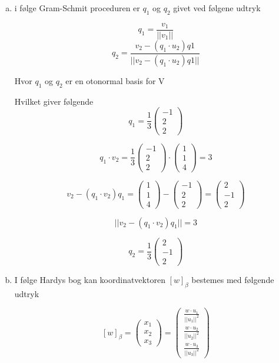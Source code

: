 \documentclass[12pt]{article}
\begin{document}
\begin{enumerate}[(a)]
\item 
i følge Gram-Schmit proceduren er $q_1$ og $q_2$ givet ved følgene udtryk

 $$q_1 = \frac{v_1}{||v_1||}$$
 $$q_2 = \frac{v_2- \left(q_1\cdot u_2\right)q1}{||v_2- \left(q_1\cdot
 u_2\right)q1||}$$

Hvor $q_1$ og $q_2$ er en otonormal basis for V

Hvilket giver følgende
$$q_1 =\frac{1}{3}
\left(\begin{array}{c}
-1\\
2\\
2
\end{array}\right)
$$

$$q_1 \cdot v_2 =\frac{1}{3}
\left(\begin{array}{c}
-1\\
2\\
2
\end{array}\right) \cdot
\left(\begin{array}{c}
1\\
1\\
4
\end{array}\right) = 3$$

$$
v_2- \left(q_1 \cdot v_2 \right)q_1 = 
\left(\begin{array}{c}
1\\
1\\
4
\end{array}\right)- 
\left(\begin{array}{c}
-1\\
2\\
2
\end{array}\right) =
\left(\begin{array}{c}
2\\
-1\\
2
\end{array}\right)  
$$

$$
||v_2- \left(q_1\cdot
 v_2\right)q_1|| = 3
 $$
 
$$
q_2 = \frac{1}{3} \left(\begin{array}{c}
2\\
-1\\
2
\end{array}\right) 
$$

\item
I følge Hardys bog kan koordinatvektoren $[w]_\beta$ bestemes med følgende
udtryk

$$
[w]_\beta =
\left(\begin{array}{c}
x_1\\
x_2\\
x_3
\end{array}\right)
=
\left(\begin{array}{c}
\frac{w\cdot u_1}{||u_1||^2}\\
\frac{w\cdot u_2}{||u_2||^2}\\
\frac{w\cdot u_3}{||u_3||^2}
\end{array}\right)
$$


\end{enumerate}
\end{document}
